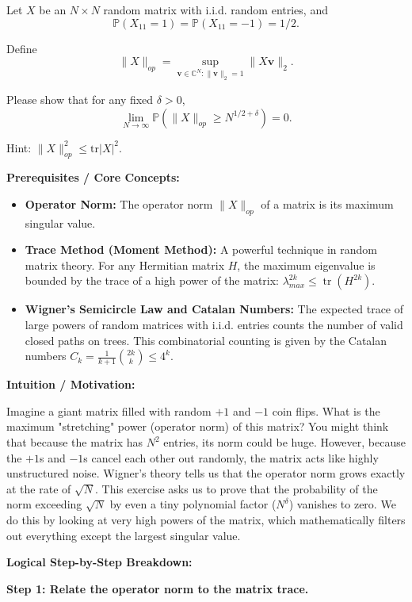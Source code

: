 \begin{exercise}\label{probability:2016:2}
Let $X$ be an $N \times N$ random matrix with i.i.d. random entries, and
\[
\mathbb{P}(X_{11} = 1) = \mathbb{P}(X_{11} = -1) = 1/2.
\]

Define
\[
\|X\|_{op} = \sup_{\mathbf{v} \in \mathbb{C}^N: \|\mathbf{v}\|_2 = 1} \|X\mathbf{v}\|_2.
\]

Please show that for any fixed $\delta > 0$,
\[
\lim_{N \to \infty} \mathbb{P}(\|X\|_{op} \geq N^{1/2+\delta}) = 0.
\]

Hint: $\|X\|_{op}^2 \leq \mathrm{tr}|X|^2$.
\end{exercise}
\begin{solution}
\textbf{Prerequisites / Core Concepts:}
\begin{itemize}
    \item \textbf{Operator Norm:} The operator norm $\|X\|_{op}$ of a matrix is its maximum singular value.
    \item \textbf{Trace Method (Moment Method):} A powerful technique in random matrix theory. For any Hermitian matrix $H$, the maximum eigenvalue is bounded by the trace of a high power of the matrix: $\lambda_{max}^{2k} \leq \operatorname{tr}(H^{2k})$.
    \item \textbf{Wigner's Semicircle Law and Catalan Numbers:} The expected trace of large powers of random matrices with i.i.d. entries counts the number of valid closed paths on trees. This combinatorial counting is given by the Catalan numbers $C_k = \frac{1}{k+1}\binom{2k}{k} \leq 4^k$.
\end{itemize}

\textbf{Intuition / Motivation:}

Imagine a giant matrix filled with random $+1$ and $-1$ coin flips. What is the maximum "stretching" power (operator norm) of this matrix? You might think that because the matrix has $N^2$ entries, its norm could be huge. However, because the $+1$s and $-1$s cancel each other out randomly, the matrix acts like highly unstructured noise. Wigner's theory tells us that the operator norm grows exactly at the rate of $\sqrt{N}$. This exercise asks us to prove that the probability of the norm exceeding $\sqrt{N}$ by even a tiny polynomial factor ($N^\delta$) vanishes to zero. We do this by looking at very high powers of the matrix, which mathematically filters out everything except the largest singular value.

\textbf{Logical Step-by-Step Breakdown:}

\textbf{Step 1: Relate the operator norm to the matrix trace.}


\end{solution}
